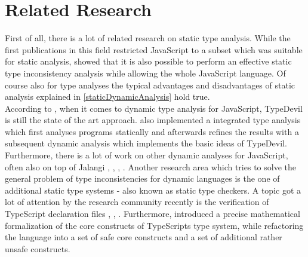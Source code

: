 \documentclass[runningheads,a4paper]{llncs}
\begin{document}

\section{Related Research}

First of all, there is a lot of related research on static type analysis.
While the first publications in this field restricted JavaScript to a subset which was suitable for static analysis, \cite{DBLP:conf/sas/JensenMT09} showed that it is also possible to perform an effective static type inconsistency analysis while allowing the whole JavaScript language.
Of course also for type analyses the typical advantages and disadvantages of static analysis explained in \ref{staticDynamicAnalysis} hold true.\\
According to \cite{DBLP:conf/icse/TanXCLYS17}, when it comes to dynamic type analysis for JavaScript, TypeDevil is still the state of the art approach. 
\cite{DBLP:conf/icse/TanXCLYS17} also implemented a integrated type analysis which first analyses programs statically and afterwards refines the results with a subsequent dynamic analysis which implements the basic ideas of TypeDevil.
Furthermore, there is a lot of work on other dynamic analyses for JavaScript, often also on top of Jalangi \cite{DBLP:phd/basesearch/Austin13}, \cite{DBLP:conf/issta/GongPSS15}, \cite{DBLP:conf/sigsoft/GongPS15}, \cite{DBLP:conf/sigsoft/JensenSSC15}.
Another research area which tries to solve the general problem of type inconsistencies for dynamic languages is the one of additional static type systems - also known as static type checkers.
A topic got a lot of attention by the research community recently is the verification of TypeScript declaration files \cite{DBLP:conf/fase/KristensenM17}, \cite{DBLP:conf/ecoop/WilliamsMWZ17}, \cite{DBLP:journals/pacmpl/KristensenM17}.
Furthermore, \cite{DBLP:conf/ecoop/BiermanAT14} introduced a precise mathematical formalization of the core constructs of TypeScripts type system, while refactoring the language into a set of safe core constructs and a set of additional rather unsafe constructs.
\end{document}
